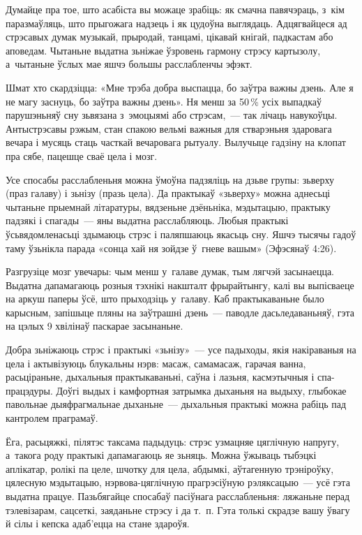 Думайце пра тое, што асабіста вы можаце зрабіць: як смачна павячэраць, з~кім паразмаўляць, што прыгожага надзець і як цудоўна выглядаць. Адцягвайцеся ад стрэсавых думак музыкай, прыродай, танцамі, цікавай кнігай, падкастам або аповедам. Чытаньне выдатна зьніжае ўзровень гармону стрэсу картызолу, а~чытаньне ўслых мае яшчэ большы расслабленчы эфэкт.

Шмат хто скардзіцца: «Мне трэба добра выспацца, бо заўтра важны дзень. Але я не магу заснуць, бо заўтра важны дзень». Ня менш за 50\,\% усіх выпадкаў парушэньняў сну зьвязана з~эмоцыямі або стрэсам,~--- так лічаць навукоўцы. Антыстрэсавы рэжым, стан спакою вельмі важныя для стварэньня здаровага вечара і мусяць стаць часткай вечаровага рытуалу. Вылучыце гадзіну на клопат пра сябе, пацешце сваё цела і мозг.

Усе спосабы расслабленьня можна ўмоўна падзяліць на дзьве групы: зьверху (праз галаву) і зьнізу (празь цела). Да практыкаў «зьверху» можна аднесьці чытаньне прыемнай літаратуры, вядзеньне дзёньніка, мэдытацыю, практыку падзякі і спагады~--- яны выдатна расслабляюць. Любыя практыкі ўсьвядомленасьці здымаюць стрэс і паляпшаюць якасьць сну. Яшчэ тысячы гадоў таму ўзьнікла парада «сонца хай ня зойдзе ў~гневе вашым» (Эфэсянаў 4:26).

Разгрузіце мозг увечары: чым менш у~галаве думак, тым лягчэй засынаецца. Выдатна дапамагаюць розныя тэхнікі накшталт фрырайтынгу, калі вы выпісваеце на аркуш паперы ўсё, што прыходзіць у~галаву. Каб практыкаваньне было карысным, запішыце пляны на заўтрашні дзень~--- паводле дасьледаваньняў, гэта на цэлых 9 хвілінаў паскарае засынаньне.

Добра зьніжаюць стрэс і практыкі «зьнізу»~--- усе падыходы, якія накіраваныя на цела і актывізуюць блукальны нэрв: масаж, самамасаж, гарачая ванна, расьціраньне, дыхальныя практыкаваньні, саўна і лазьня, касмэтычныя і спа-працэдуры. Доўгі выдых і камфортная затрымка дыханьня на выдыху, глыбокае павольнае дыяфрагмальнае дыханьне~--- дыхальныя практыкі можна рабіць пад кантролем праграмаў.

Ёга, расьцяжкі, пілятэс таксама падыдуць: стрэс узмацняе цяглічную напругу, а~такога роду практыкі дапамагаюць яе зьняць. Можна ўжываць тыбэцкі аплікатар, ролікі па целе, шчотку для цела, абдымкі, аўтагенную трэніроўку, цялесную мэдытацыю, нэрвова-цяглічную прагрэсіўную рэляксацыю~--- усё гэта выдатна працуе. Пазьбягайце спосабаў пасіўнага расслабленьня: ляжаньне перад тэлевізарам, сацсеткі, заяданьне стрэсу і да т.~п. Гэта толькі скрадзе вашу ўвагу й сілы і кепска адаб'ецца на стане здароўя.

